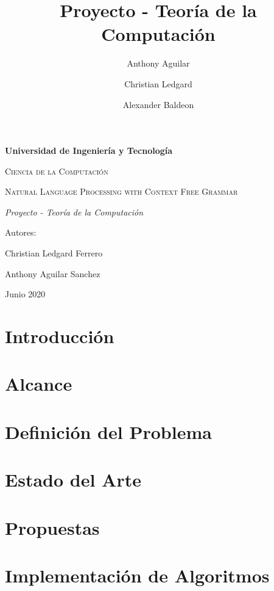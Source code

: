 \documentclass[12pt]{article}
\author{Anthony Aguilar \and Christian Ledgard \and Alexander Baldeon}
\title{Proyecto - Teoría de la Computación}
\begin{document}
  \begin{titlepage}
    \centering
    {\bfseries\LARGE Universidad de Ingeniería y Tecnología\par}
    \vspace{2cm}
    {\scshape\Large Ciencia de la Computación\par}
    \vspace{3cm}
    {\scshape\Huge Natural Language Processing with Context Free Grammar\par}
    \vspace{3cm}
    {\itshape\Large Proyecto - Teoría de la Computación\par}
    \vfill
    {\Large Autores: \par}
    {\Large Christian Ledgard Ferrero\par}
    {\Large Anthony Aguilar Sanchez\par}
    
    \vfill
    {\Large Junio 2020 \par}
  \end{titlepage}
  \thispagestyle{fancy}

\tableofcontents

\newpage

\section{Introducción}
 

\section{Alcance}


\section{Definición del Problema}


\section{Estado del Arte}


\section{Propuestas}

\newpage

\section{Implementación de Algoritmos}
\end{document}
